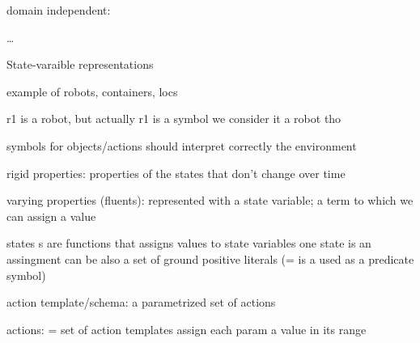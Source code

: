 \documentclass[11pt,a4paper]{article}
\theoremstyle{definition}
\theoremstyle{plain}
\theoremstyle{remark}
\begin{document}
domain independent:


\dots


State-varaible representations 

example of robots, containers, locs 

r1 is a robot, but actually r1 is a symbol 
we consider it a robot tho 

symbols for objects/actions should interpret correctly the environment
 

rigid properties: properties of the states that don't change over time 

varying properties (fluents): represented with a state variable; a term to which we can assign a value

states s are functions that assigns values to state variables
one state is an assingment 
can be also a set of ground positive literals (= is a used as a predicate symbol)


action template/schema: a parametrized set of actions 


actions: \A = set of action templates
assign each param a value in its range

\fi %
\end{document}
